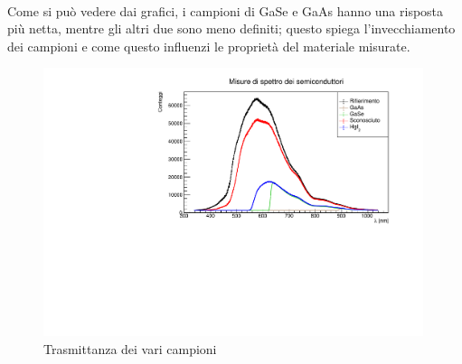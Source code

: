 \documentclass[11pt]{article} %
\begin{document}
\\Come si può vedere dai grafici, i campioni di GaSe e GaAs hanno una risposta più netta, mentre gli altri due sono meno definiti; questo spiega l'invecchiamento dei campioni e come questo influenzi le proprietà del materiale misurate.
\begin{figure}[h!]
\begin{center}
\includegraphics[width=420px]{img/spectrum.pdf}
\caption{Trasmittanza dei vari campioni}
\end{center}
\end{figure}
\end{document}
